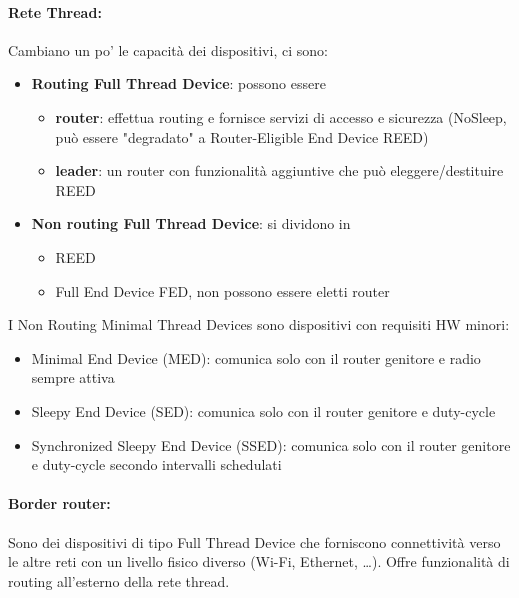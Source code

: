 \paragraph{Rete Thread:} Cambiano un po' le capacità dei dispositivi, ci sono: 
\begin{itemize}
	\item \textbf{Routing Full Thread Device}: possono essere
	\begin{itemize}
		\item \textbf{router}: effettua routing e fornisce servizi di accesso e sicurezza (NoSleep, può essere "degradato" a Router-Eligible End Device REED)
		
        \item \textbf{leader}: un router con funzionalità aggiuntive che può eleggere/destituire REED
	\end{itemize}
	
    \item \textbf{Non routing Full Thread Device}: si dividono in
	\begin{itemize}
		\item REED
	
    	\item Full End Device FED, non possono essere eletti router
	\end{itemize}
\end{itemize}

I Non Routing Minimal Thread Devices sono dispositivi con requisiti HW minori:
\begin{itemize}
	\item Minimal End Device (MED): comunica solo con il router genitore e radio sempre attiva

	\item Sleepy End Device (SED): comunica solo con il router genitore e duty-cycle

	\item Synchronized Sleepy End Device (SSED): comunica solo con il router genitore e duty-cycle secondo intervalli schedulati
\end{itemize}

\paragraph{Border router:} Sono dei dispositivi di tipo Full Thread Device che forniscono connettività verso le altre reti con un livello fisico diverso (Wi-Fi, Ethernet, \dots). Offre funzionalità di routing all'esterno della rete thread.

